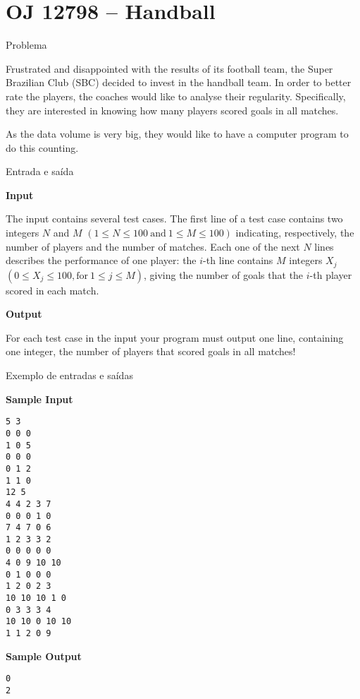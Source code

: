 \section{OJ 12798 -- Handball}

\begin{frame}[fragile]{Problema}

Frustrated and disappointed with the results of its football team, the Super Brazilian Club (SBC)
decided to invest in the handball team. In order to better rate the players, the coaches would like to
analyse their regularity. Specifically, they are interested in knowing how many players scored goals in
all matches.

As the data volume is very big, they would like to have a computer program to do this counting.

\end{frame}

\begin{frame}[fragile]{Entrada e saída}

\textbf{Input}

The input contains several test cases. The first line of a test case contains two integers $N$ and 
$M$ $(1\leq N\leq 100\ \mbox{and}\ 1\leq M\leq 100)$ indicating, respectively, the number of players and the number of matches. Each one of the next $N$ lines describes the performance of one player: 
the $i$-th line contains $M$ integers $X_j$ $(0\leq X_j\leq 100, \mbox{for}\ 1\leq j\leq M)$, 
giving the number of goals that the $i$-th player scored in each match.

\textbf{Output}

For each test case in the input your program must output one line, containing one integer, the number
of players that scored goals in all matches!

\end{frame}


\begin{frame}[fragile]{Exemplo de entradas e saídas}

\begin{footnotesize}
\begin{minipage}[t]{0.6\textwidth}
\textbf{Sample Input}
\begin{verbatim}
5 3
0 0 0
1 0 5
0 0 0
0 1 2
1 1 0
12 5
4 4 2 3 7
0 0 0 1 0
7 4 7 0 6
1 2 3 3 2
0 0 0 0 0
4 0 9 10 10
0 1 0 0 0
1 2 0 2 3
10 10 10 1 0
0 3 3 3 4
10 10 0 10 10
1 1 2 0 9
\end{verbatim}
\end{minipage}
\begin{minipage}[t]{0.35\textwidth}
\textbf{Sample Output}
\begin{verbatim}
0
2
\end{verbatim}
\end{minipage}
\end{footnotesize}

\end{frame}

